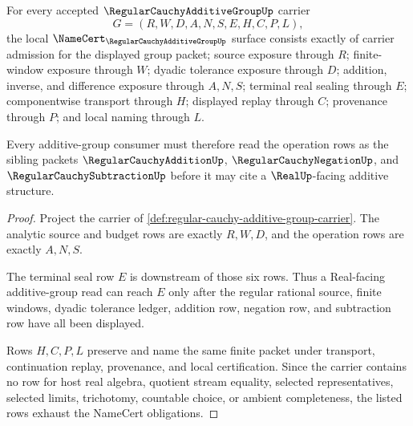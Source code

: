 \begin{theorem}
\label{thm:regular-cauchy-additive-group-namecert-obligations}
For every accepted $\RegularCauchyAdditiveGroupUp$ carrier
$$
G=(R,W,D,A,N,S,E,H,C,P,L),
$$
the local $\NameCert_{\RegularCauchyAdditiveGroupUp}$ surface consists exactly of carrier admission for the displayed group packet; source exposure through $R$; finite-window exposure through $W$; dyadic tolerance exposure through $D$; addition, inverse, and difference exposure through $A,N,S$; terminal real sealing through $E$; componentwise transport through $H$; displayed replay through $C$; provenance through $P$; and local naming through $L$.

Every additive-group consumer must therefore read the operation rows as the sibling packets $\RegularCauchyAdditionUp$, $\RegularCauchyNegationUp$, and $\RegularCauchySubtractionUp$ before it may cite a $\RealUp$-facing additive structure.
\end{theorem}
\begin{proof}
Project the carrier of \autoref{def:regular-cauchy-additive-group-carrier}. The analytic source and budget rows are exactly $R,W,D$, and the operation rows are exactly $A,N,S$.

The terminal seal row $E$ is downstream of those six rows. Thus a Real-facing additive-group read can reach $E$ only after the regular rational source, finite windows, dyadic tolerance ledger, addition row, negation row, and subtraction row have all been displayed.

Rows $H,C,P,L$ preserve and name the same finite packet under transport, continuation replay, provenance, and local certification. Since the carrier contains no row for host real algebra, quotient stream equality, selected representatives, selected limits, trichotomy, countable choice, or ambient completeness, the listed rows exhaust the NameCert obligations.
\end{proof}

